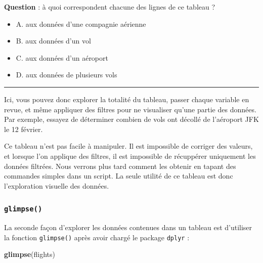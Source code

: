 \documentclass[a4paperpaper,]{article}
\newenvironment{Shaded}{\begin{snugshade}}{\end{snugshade}}
\newcommand{\KeywordTok}[1]{\textcolor[rgb]{0.12,0.11,0.11}{\textbf{#1}}}
\newcommand{\NormalTok}[1]{\textcolor[rgb]{0.12,0.11,0.11}{#1}}
\providecommand{\tightlist}{%
  \setlength{\itemsep}{0pt}\setlength{\parskip}{0pt}}
\begin{document}
\textbf{Question } : à quoi correspondent chacune des lignes de ce tableau ?

\begin{itemize}
\tightlist
\item
  A. aux données d'une compagnie aérienne
\item
  B. aux données d'un vol
\item
  C. aux données d'un aéroport
\item
  D. aux données de plusieurs vols
\end{itemize}

\begin{center}\rule{0.5\linewidth}{\linethickness}\end{center}

Ici, vous pouvez donc explorer la totalité du tableau, passer chaque variable en revue, et même appliquer des filtres pour ne visualiser qu'une partie des données. Par exemple, essayez de déterminer combien de vols ont décollé de l'aéroport JFK le 12 février.

Ce tableau n'est pas facile à manipuler. Il est impossible de corriger des valeurs, et lorsque l'on applique des filtres, il est impossible de récuppérer uniquement les données filtrées. Nous verrons plus tard comment les obtenir en tapant des commandes simples dans un script. La seule utilité de ce tableau est donc l'exploration visuelle des données.

\hypertarget{glimpse}{%
\subsubsection{\texorpdfstring{\texttt{glimpse()}}{glimpse()}}\label{glimpse}}

La seconde façon d'explorer les données contenues dans un tableau est d'utiliser la fonction \texttt{glimpse()} après avoir chargé le package \texttt{dplyr} :

\begin{Shaded}
\begin{Highlighting}[]
\KeywordTok{glimpse}\NormalTok{(flights)}
\end{Highlighting}
\end{Shaded}
\end{document}
